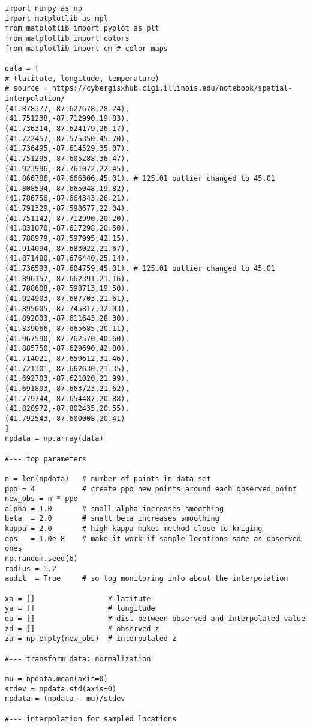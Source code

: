 \documentclass[oneside,10pt]{book}
\begin{document}
\begin{lstlisting}
import numpy as np
import matplotlib as mpl
from matplotlib import pyplot as plt
from matplotlib import colors  
from matplotlib import cm # color maps

data = [
# (latitute, longitude, temperature)
# source = https://cybergisxhub.cigi.illinois.edu/notebook/spatial-interpolation/
(41.878377,-87.627678,28.24),
(41.751238,-87.712990,19.83),
(41.736314,-87.624179,26.17),
(41.722457,-87.575350,45.70),
(41.736495,-87.614529,35.07),
(41.751295,-87.605288,36.47),
(41.923996,-87.761072,22.45),
(41.866786,-87.666306,45.01), # 125.01 outlier changed to 45.01
(41.808594,-87.665048,19.82),
(41.786756,-87.664343,26.21),
(41.791329,-87.598677,22.04),
(41.751142,-87.712990,20.20),
(41.831070,-87.617298,20.50),
(41.788979,-87.597995,42.15),
(41.914094,-87.683022,21.67),
(41.871480,-87.676440,25.14),
(41.736593,-87.604759,45.01), # 125.01 outlier changed to 45.01
(41.896157,-87.662391,21.16),
(41.788608,-87.598713,19.50),
(41.924903,-87.687703,21.61),
(41.895005,-87.745817,32.03),
(41.892003,-87.611643,28.30),
(41.839066,-87.665685,20.11),
(41.967590,-87.762570,40.60),
(41.885750,-87.629690,42.80),
(41.714021,-87.659612,31.46),
(41.721301,-87.662630,21.35),
(41.692703,-87.621020,21.99),
(41.691803,-87.663723,21.62),
(41.779744,-87.654487,20.88),
(41.820972,-87.802435,20.55),
(41.792543,-87.600008,20.41)
]
npdata = np.array(data)

#--- top parameters 

n = len(npdata)   # number of points in data set
ppo = 4           # create ppo new points around each observed point
new_obs = n * ppo  
alpha = 1.0       # small alpha increases smoothing
beta  = 2.0       # small beta increases smoothing
kappa = 2.0       # high kappa makes method close to kriging
eps   = 1.0e-8    # make it work if sample locations same as observed ones
np.random.seed(6)
radius = 1.2
audit  = True     # so log monitoring info about the interpolation        

xa = []                 # latitute
ya = []                 # longitude
da = []                 # dist between observed and interpolated value
zd = []                 # observed z
za = np.empty(new_obs)  # interpolated z

#--- transform data: normalization 

mu = npdata.mean(axis=0)
stdev = npdata.std(axis=0)
npdata = (npdata - mu)/stdev

#--- interpolation for sampled locations


\end{lstlisting}
\end{document}
